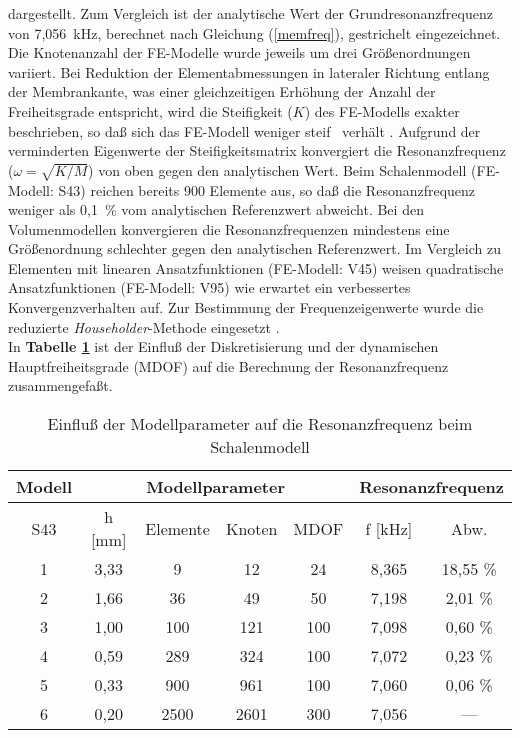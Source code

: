 dargestellt. Zum Vergleich ist der analytische Wert der
Grundresonanzfrequenz von 7,056~kHz, berechnet nach Gleichung
(\ref{memfreq}), gestrichelt eingezeichnet. Die Knotenanzahl
der FE-Modelle wurde jeweils um drei Größenordnungen variiert.
Bei Reduktion der Elementabmessungen in lateraler Richtung entlang der
Membrankante, was einer gleichzeitigen Erhöhung der Anzahl der
Freiheitsgrade entspricht, wird die Steifigkeit ($K$) des FE-Modells
exakter beschrieben, so daß sich das FE-Modell weniger \glqq steif\grqq
\, verhält \cite{Zie84}. Aufgrund der verminderten Eigenwerte der
Steifigkeitsmatrix konvergiert die Resonanzfrequenz ($\omega = \sqrt{K/M}$)
von oben gegen den analytischen Wert.
Beim Schalenmodell (FE-Modell: S43) reichen bereits 900 Elemente aus,
so daß die Resonanzfrequenz weniger als 0,1~\% vom analytischen
Referenzwert abweicht. Bei den Volumenmodellen konvergieren die
Resonanzfrequenzen mindestens eine Größenordnung schlechter gegen
den analytischen Referenzwert. Im Vergleich zu Elementen mit
linearen Ansatzfunktionen (FE-Modell: V45) weisen quadratische
Ansatzfunktionen (FE-Modell: V95) wie erwartet ein verbessertes
Konvergenzverhalten auf.
Zur Bestimmung der Frequenzeigenwerte wurde die reduzierte
{\sl Householder}-Methode eingesetzt \cite{Koh92}.\\
In {\bf Tabelle \ref{tabdiskfreq}}
ist der Einfluß der Diskretisierung und der dynamischen Hauptfreiheitsgrade
(MDOF) auf die Berechnung der Resonanzfrequenz zusammengefaßt.
\begin{table}[htb]
\caption{\label{tabdiskfreq}
 Einfluß der Modellparameter auf die Resonanzfrequenz beim Schalenmodell}
\begin{center}
\begin{tabular} {|c||c|c|c|c||c|c|}
\hline
Modell & \multicolumn{4}{c||}{Modellparameter}
       & \multicolumn{2}{c|}{Resonanzfrequenz} \\
\hline
S43 & h [mm] & Elemente & Knoten & MDOF & f [kHz] & Abw. \\
\hline \hline
1  & 3,33 &    9  &    12 &  24 & 8,365 & 18,55 \% \\
2  & 1,66 &   36  &    49 &  50 & 7,198 &  2,01 \% \\
3  & 1,00 &  100  &   121 & 100 & 7,098 &  0,60 \% \\
4  & 0,59 &  289  &   324 & 100 & 7,072 &  0,23 \% \\
5  & 0,33 &  900  &   961 & 100 & 7,060 &  0,06 \% \\
6  & 0,20 & 2500  &  2601 & 300 & 7,056 &  --- \\
\hline
\end{tabular}\\
\end{center}
\end{table}
